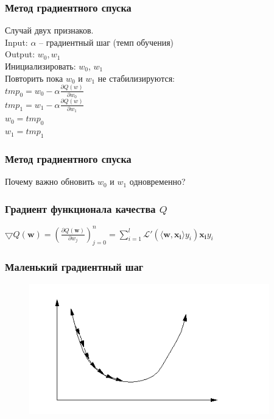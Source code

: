 \documentclass[12pt]{beamer}
\begin{document}
\begin{frame}\frametitle{Метод градиентного спуска}
Случай двух признаков.\\
Input: $\alpha$ -- градиентный шаг (темп обучения)\\
Output: $w_0, w_1$\\
\vspace{3mm}
Инициализировать: $w_0$, $w_1$\\
Повторить пока $w_0$ и $w_1$ не стабилизируются:\\
\hspace{10mm} $tmp_0 =  w_0 - \alpha \frac{\partial Q(w)}{\partial w_0}$\\
\hspace{10mm} $tmp_1 =  w_1 - \alpha \frac{\partial Q(w)}{\partial w_1}$\\
\hspace{10mm} $w_0 = tmp_0$\\
\hspace{10mm} $w_1 = tmp_1$
\end{frame}

\begin{frame}\frametitle{Метод градиентного спуска}
Почему важно обновить $w_0$ и $w_1$ одновременно?
\end{frame}

\begin{frame}\frametitle{Градиент функционала качества $Q$}
$\bigtriangledown Q(\mathbf{w}) = (\frac{\partial Q(\mathbf{w})}{\partial w_j})_{j=0}^n = \sum\limits_{i=1}^l \mathcal{L}'(\langle \mathbf{w}, \mathbf{x_i} \rangle y_i) \mathbf{x_i} y_i$\\
\end{frame}

\begin{frame}\frametitle{Маленький градиентный шаг}
\begin{figure}[htbp]
  \includegraphics[height=160pt, keepaspectratio = true]{images/learning_rate_small}
\end{figure}
\end{frame}
\end{document}
